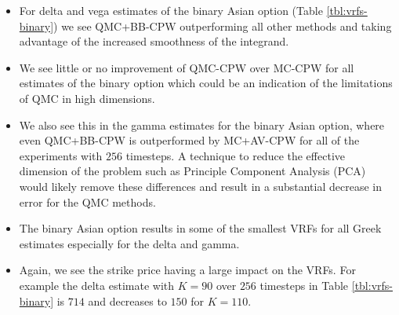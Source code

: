 \begin{itemize}
    \item For delta and vega estimates of the binary Asian option (Table \ref{tbl:vrfs-binary}) we see QMC+BB-CPW outperforming all other methods and taking advantage of the increased smoothness of the integrand.
    \item We see little or no improvement of QMC-CPW over MC-CPW for all estimates of the binary option which could be an indication of the limitations of QMC in high dimensions.
    \item We also see this in the gamma estimates for the binary Asian option, where even QMC+BB-CPW is outperformed by MC+AV-CPW for all of the experiments with $256$ timesteps. A technique to reduce the effective dimension of the problem such as Principle Component Analysis (PCA) would likely remove these differences and result in a substantial decrease in error for the QMC methods.
    \item The binary Asian option results in some of the smallest VRFs for all Greek estimates especially for the delta and gamma.
    \item Again, we see the strike price having a large impact on the VRFs. For example the delta estimate with $K=90$ over $256$ timesteps in Table \ref{tbl:vrfs-binary} is $714$ and decreases to $150$ for $K=110$.
\end{itemize}

